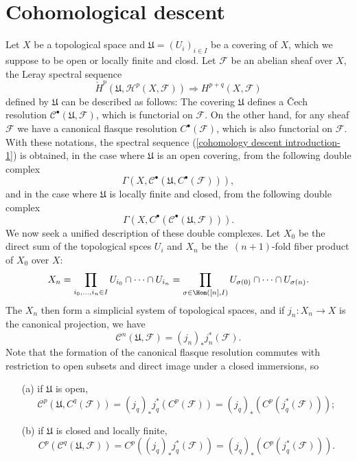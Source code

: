 \section{Cohomological descent}
Let $X$ be a topological space and $\mathfrak{U}=(U_i)_{i\in I}$ be a covering of $X$, which we suppose to be open or locally finite and closd. Let $\mathscr{F}$ be an abelian sheaf over $X$, the Leray spectral sequence
\begin{equation}\label{cohomology descent introduction-1}
\check{H}^p(\mathfrak{U},\mathcal{H}^p(X,\mathscr{F}))\Rightarrow H^{p+q}(X,\mathscr{F})
\end{equation}
defined by $\mathfrak{U}$ can be described as follows: The covering $\mathfrak{U}$ defines a \v{C}ech resolution $\mathscr{C}^\bullet(\mathfrak{U},\mathscr{F})$, which is functorial on $\mathscr{F}$. On the other hand, for any sheaf $\mathscr{F}$ we have a canonical flasque resolution $C^\bullet(\mathscr{F})$, which is also functorial on $\mathscr{F}$. With these notations, the spectral sequence (\ref{cohomology descent introduction-1}) is obtained, in the case where $\mathfrak{U}$ is an open covering, from the following double complex
\[\Gamma(X,\mathscr{C}^\bullet(\mathfrak{U},C^\bullet(\mathscr{F}))),\]
and in the case where $\mathfrak{U}$ is locally finite and closed, from the following double complex
\[\Gamma(X,C^\bullet(\mathscr{C}^\bullet(\mathfrak{U},\mathscr{F}))).\]
We now seek a unified description of these double complexes. Let $X_0$ be the direct sum of the topological spces $U_i$ and $X_n$ be the~$(n+1)$-fold fiber product of $X_0$ over $X$:
\begin{equation}\label{cohomology descent introduction-2}
X_n=\prod_{i_0,\dots,i_n\in I}U_{i_0}\cap\cdots\cap U_{i_n}=\prod_{\sigma\in\Hom([n],I)}U_{\sigma(0)}\cap\cdots\cap U_{\sigma(n)}.
\end{equation}
The $X_n$ then form a simplicial system of topological spaces, and if $j_n:X_n\to X$ is the canonical projection, we have 
\begin{equation}\label{cohomology descent introduction-3}
\mathscr{C}^n(\mathfrak{U},\mathscr{F})=(j_n)_*j_n^*(\mathscr{F}).
\end{equation}
Note that the formation of the canonical flasque resolution commutes with restriction to open subsets and direct image under a closed immersions, so
\begin{enumerate}
\item[(a)] if $\mathfrak{U}$ is open, 
\[\mathscr{C}^p(\mathfrak{U},C^q(\mathscr{F}))=(j_q)_*j_q^*(C^p(\mathscr{F}))=(j_q)_*(C^p(j_q^*(\mathscr{F})));\]
\item[(b)] if $\mathfrak{U}$ is closed and locally finite,
\[C^p(\mathscr{C}^q(\mathfrak{U},\mathscr{F}))=C^p((j_q)_*j_q^*(\mathscr{F}))=(j_q)_*(C^p(j_q^*(\mathscr{F}))).\]
\end{enumerate}
